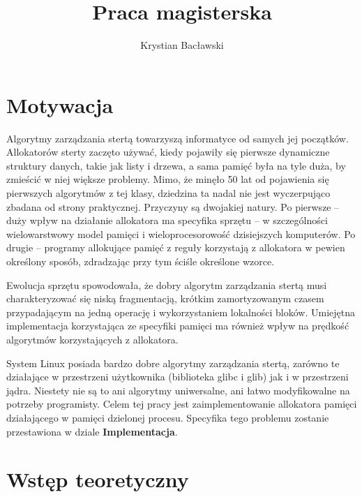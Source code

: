 \documentclass[12pt,a4paper,titlepage,twoside]{mwart}
\author{Krystian Bacławski}
\title{Praca magisterska}
\begin{document}
\maketitle
\cleardoublepage

\tableofcontents
\cleardoublepage


\setlength{\parindent}{0pt}
\setlength{\parskip}{1.2ex plus 0.5ex minus 0.2ex}

\section{Motywacja}

Algorytmy zarządzania stertą towarzyszą informatyce od samych jej początków.
Allokatorów sterty zaczęto używać, kiedy pojawiły się pierwsze dynamiczne
struktury danych, takie jak listy i drzewa, a sama pamięć była na tyle duża, by
zmieścić w niej większe problemy. Mimo, że minęło 50 lat od pojawienia się
pierwszych algorytmów z tej klasy, dziedzina ta nadal nie jest wyczerpująco
zbadana od strony praktycznej. Przyczyny są dwojakiej natury. Po pierwsze --
duży wpływ na działanie allokatora ma specyfika sprzętu -- w szczególności
wielowarstwowy model pamięci i wieloprocesorowość dzisiejszych komputerów. Po
drugie -- programy allokujące pamięć z reguły korzystają z allokatora w pewien
określony sposób, zdradzając przy tym ściśle określone wzorce.

Ewolucja sprzętu spowodowała, że dobry algorytm zarządzania stertą 
musi charakteryzować się niską fragmentacją, krótkim zamortyzowanym czasem
przypadającym na jedną operację i wykorzystaniem lokalności bloków.
Umiejętna implementacja korzystająca ze specyfiki pamięci ma również wpływ
na prędkość algorytmów korzystających z allokatora.

System Linux posiada bardzo dobre algorytmy zarządzania stertą, zarówno te
działające w przestrzeni użytkownika (biblioteka glibc i glib) jak i w
przestrzeni jądra. Niestety nie są to ani algorytmy uniwersalne, ani łatwo
modyfikowalne na potrzeby programisty. Celem tej pracy jest zaimplementowanie
allokatora pamięci działającego w pamięci dzielonej procesu. Specyfika tego
problemu zostanie przestawiona w dziale \textbf{Implementacja}.

\section{Wstęp teoretyczny}
\end{document}
